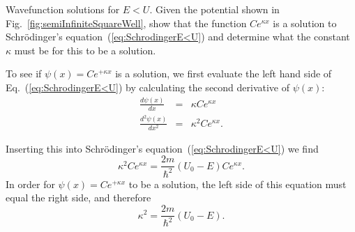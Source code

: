 \begin{example}{Wavefunction solutions for $E < U$.}
\label{ex:SolutionElessU}
  Given the potential shown in Fig.~\ref{fig:semiInfiniteSquareWell},
  show that the function $C e^{\kappa x}$ is a solution to
  Schr\"odinger's equation~(\ref{eq:SchrodingerE<U}) and determine
  what the constant $\kappa$ must be for this to be a solution.

 To see if $\psi(x) = C e^{+\kappa x}$ is a
solution, we first evaluate the left hand side of Eq.~(\ref{eq:SchrodingerE<U})
 by calculating the second derivative of $\psi(x)$:
\begin{eqnarray}
\frac{d \psi(x)}{dx} & = & \kappa  C e^{\kappa x} \nonumber \\
\frac{d^2 \psi(x)}{dx^2} & = & \kappa^2 C e^{\kappa x}. 
\end{eqnarray}

\noindent Inserting this into Schr\"odinger's equation~(\ref{eq:SchrodingerE<U})
we find \begin{equation}
\kappa^2 C e^{\kappa x} 
   = \frac{2m}{\hbar^2}\left( U_0 - E \right) C e^{\kappa x} .
\end{equation}
In order for $\psi(x) = C e^{+\kappa x}$ to be a solution,
the left side of this equation must equal the right side, and
therefore
\begin{equation}
\kappa^2 = \frac{2m}{\hbar^2}\left( U_0 - E \right) .
\end{equation}
\end{example}
\newpage

